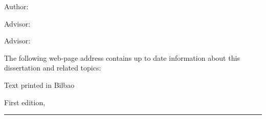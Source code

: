 
\thispagestyle{empty}

\hfill

\vfill

\medskip


\noindent
\textit{
\Title
}


Author: \Author

Advisor: \Advisor

Advisor: \Advisortwo


\vfill




\vfill


\noindent
The following web-page address contains up to date information about this dissertation and related topics: \\
\website


\noindent
Text printed in Bilbao

\noindent
First edition, 
\monthname \ \the\year

\vspace{1cm}
\hrule
\bigskip

\cleardoublepage

%
%
%
%
%
%

